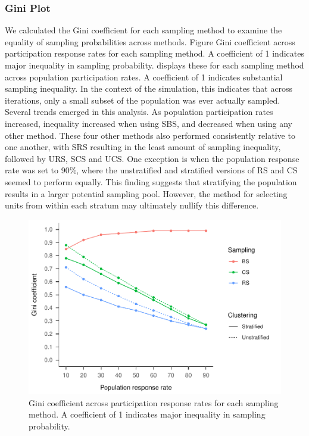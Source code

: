 \documentclass[man,floatsintext]{apa6}
\begin{document}
\hypertarget{gini-plot}{%
\subsubsection{Gini Plot}\label{gini-plot}}

We calculated the Gini coefficient for each sampling method to examine the equality of sampling probabilities across methods. Figure Gini coefficient across participation response rates for each sampling method. A coefficient of 1 indicates major inequality in sampling probability. displays these for each sampling method across population participation rates. A coefficient of 1 indicates substantial sampling inequality. In the context of the simulation, this indicates that across iterations, only a small subset of the population was ever actually sampled. Several trends emerged in this analysis. As population participation rates increased, inequality increased when using SBS, and decreased when using any other method. These four other methods also performed consistently relative to one another, with SRS resulting in the least amount of sampling inequality, followed by URS, SCS and UCS. One exception is when the population response rate was set to 90\%, where the unstratified and stratified versions of RS and CS seemed to perform equally. This finding suggests that stratifying the population results in a larger potential sampling pool. However, the method for selecting units from within each stratum may ultimately nullify this difference.



\begin{figure}
\centering
\includegraphics{GenSamp-Paper_files/figure-latex/fig-gini-1.pdf}
\caption{\label{fig:fig-gini}Gini coefficient across participation response rates for each sampling method. A coefficient of 1 indicates major inequality in sampling probability.}
\end{figure}
\end{document}
